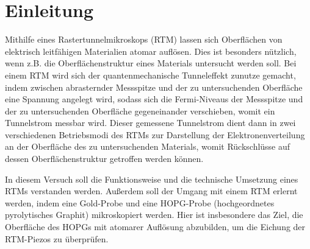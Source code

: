 \section{Einleitung}\label{sec:einleitung}
Mithilfe eines Rastertunnelmikroskops (RTM) lassen sich Oberflächen von elektrisch leitfähigen Materialien atomar auflösen. Dies ist besonders
nützlich, wenn z.B. die Oberflächenstruktur eines Materials untersucht werden soll. Bei einem RTM wird sich der quantenmechanische
Tunneleffekt zunutze gemacht, indem zwischen abrasternder Messspitze und der zu untersuchenden Oberfläche eine Spannung angelegt wird, sodass
sich die Fermi-Niveaus der Messspitze und der zu untersuchenden Oberfläche gegeneinander verschieben, womit ein Tunnelstrom messbar wird.
Dieser gemessene Tunnelstrom dient dann in zwei verschiedenen Betriebsmodi des RTMs zur Darstellung der Elektronenverteilung an der Oberfläche
des zu untersuchenden Materials, womit Rückschlüsse auf dessen Oberflächenstruktur getroffen werden können.\par
In diesem Versuch soll die Funktionsweise und die technische Umsetzung eines RTMs verstanden werden. Außerdem soll der Umgang mit einem RTM
erlernt werden, indem eine Gold-Probe und eine HOPG-Probe (hochgeordnetes pyrolytisches Graphit) mikroskopiert werden. Hier ist insbesondere das Ziel,
die Oberfläche des HOPGs mit atomarer Auflösung abzubilden, um die Eichung der RTM-Piezos zu überprüfen.